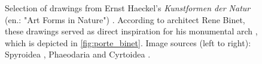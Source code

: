\documentclass{article}
\begin{document}
\begin{figure}[ht!]
    \centering
    \caption{Selection of drawings from Ernst Haeckel's \textit{Kunstformen der Natur} (en.: "Art Forms in Nature") \cite{haeckel_kunstformen_2012}. According to architect Rene Binet, these drawings served as direct inspiration for his monumental arch \cite[Sec. "Haeckel und der Jugendstil"]{willmann_haeckel_2019}, which is depicted in \cref{fig:porte_binet}. \newline Image sources (left to right): Spyroidea \cite{haeckel_kunstformen_1904}, Phaeodaria \cite{haeckel_kunstformen_1904} and Cyrtoidea \cite{haeckel_kunstformen_1904-2}.}
    \label{fig:kunstformen}
\end{figure}\vspace{-5mm}
\end{document}
